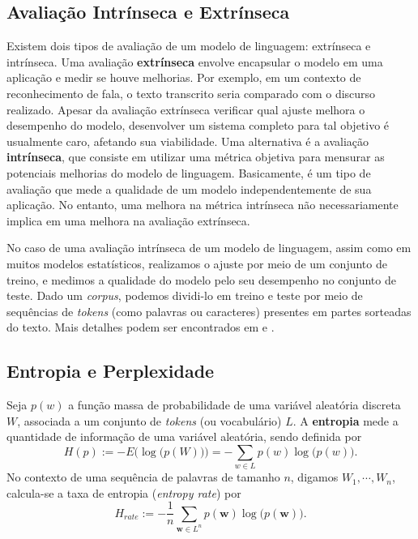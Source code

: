 \documentclass[twoside]{automatextcc}
\newcommand{\bs}[1]{\boldsymbol{#1}}
\begin{document}
\subsection{Avaliação Intrínseca e Extrínseca}
Existem dois tipos de avaliação de um modelo de linguagem: extrínseca e intrínseca. Uma avaliação \textbf{extrínseca} envolve encapsular o modelo em uma aplicação e medir se houve melhorias. Por exemplo, em um contexto de reconhecimento de fala, o texto transcrito seria comparado com o discurso realizado. Apesar da avaliação extrínseca verificar qual ajuste melhora o desempenho do modelo, desenvolver um sistema completo para tal objetivo é usualmente caro, afetando sua viabilidade. Uma alternativa é a avaliação \textbf{intrínseca}, que consiste em utilizar uma métrica objetiva para mensurar as potenciais melhorias do modelo de linguagem. Basicamente, é um tipo de avaliação que mede a qualidade de um modelo independentemente de sua aplicação. No entanto, uma melhora na métrica intrínseca não necessariamente implica em uma melhora na avaliação extrínseca. 

No caso de uma avaliação intrínseca de um modelo de linguagem, assim como em muitos modelos estatísticos, realizamos o ajuste por meio de um conjunto de treino, e medimos a qualidade do modelo pelo seu desempenho no conjunto de teste. Dado um \textit{corpus}, podemos dividi-lo em treino e teste por meio de sequências de \textit{tokens} (como palavras ou caracteres) presentes em partes sorteadas do texto. Mais detalhes podem ser encontrados em \citet{goldberg2017} e \citet{jurafsky2021}.




\subsection{Entropia e Perplexidade}
\label{entropia e perplexidade}

Seja $p(w)$ a função massa de probabilidade de uma variável aleatória discreta $W$, associada a um conjunto de \textit{tokens} (ou vocabulário) $L$. A \textbf{entropia} mede a quantidade de informação de uma variável aleatória, sendo definida por
\begin{equation*}
    H(p) := -E \big(\log \big( p(W)\big) \big) = - \sum_{w \in L} p(w) \log \big(p(w)\big). 
\end{equation*}
No contexto de uma sequência de palavras de tamanho $n$, digamos $W_1, \cdots, W_n$, calcula-se a taxa de entropia (\textit{entropy rate})  por
\begin{equation*}
    H_{rate} := - \frac{1}{n} \sum_{\bs{w} \in L^n} p(\bs{w}) \log \big(p(\bs{w})\big). 
\end{equation*}
\end{document}
